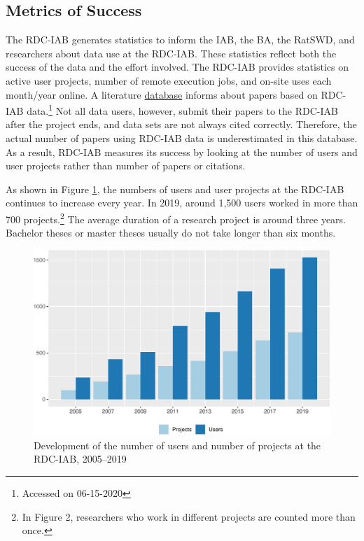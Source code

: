 \hypertarget{metrics-of-success}{%
\subsection{Metrics of Success}\label{metrics-of-success}}

The RDC-IAB generates statistics to inform the IAB, the BA, the RatSWD, and researchers about data use at the RDC-IAB. These statistics reflect both the success of the data and the effort involved. The RDC-IAB provides statistics on active user projects, number of remote execution jobs, and on-site uses each month/year online. A literature \href{https://fdz.iab.de/en/FDZ_Publications/FDZ_Literature_Database.aspx}{database} informs about papers based on RDC-IAB data.\footnote{Accessed on 06-15-2020} Not all data users, however, submit their papers to the RDC-IAB after the project ends, and data sets are not always cited correctly. Therefore, the actual number of papers using RDC-IAB data is underestimated in this database. As a result, RDC-IAB measures its success by looking at the number of users and user projects rather than number of papers or citations.

As shown in Figure \ref{fig:iabfig2}, the numbers of users and user projects at the RDC-IAB continues to increase every year. In 2019, around 1,500 users worked in more than 700 projects.\footnote{In Figure 2, researchers who work in different projects are counted more than once.} The average duration of a research project is around three years. Bachelor theses or master theses usually do not take longer than six months.

\begin{figure}
\centering
\includegraphics{figures/iabfig2-1.pdf}
\caption{\label{fig:iabfig2}Development of the number of users and number of projects at the RDC-IAB, 2005--2019}
\end{figure}

